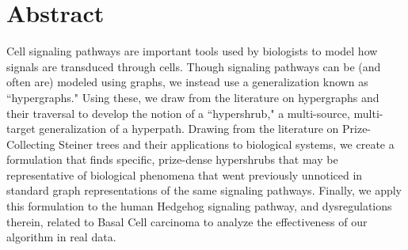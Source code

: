 \documentclass[12pt,twoside]{reedthesis}
\theoremstyle{definition}
\begin{document}
    \tableofcontents
    \listoftables
    \listoffigures

    \chapter*{Abstract}
	Cell signaling pathways are important tools used by biologists to model how signals are transduced through cells. Though signaling pathways can be (and often are) modeled using graphs, we instead use a generalization known as ``hypergraphs." Using these, we draw from the literature on hypergraphs and their traversal to develop the notion of a ``hypershrub," a multi-source, multi-target generalization of a hyperpath. Drawing from the literature on Prize-Collecting Steiner trees and their applications to biological systems, we create a formulation that finds specific, prize-dense hypershrubs that may be representative of biological phenomena that went previously unnoticed in standard graph representations of the same signaling pathways. Finally, we apply this formulation to the human Hedgehog signaling pathway, and dysregulations therein, related to Basal Cell carcinoma to analyze the effectiveness of our algorithm in real data.
\end{document}
